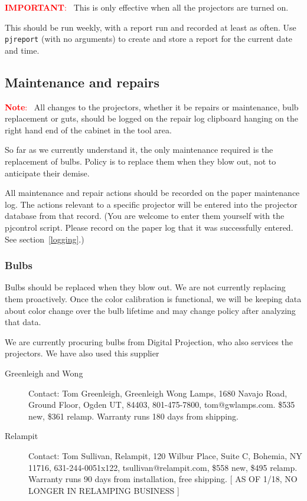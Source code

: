 \documentclass[11pt]{article}
\newenvironment{note}[1][Note]{\begin{lrbox}{\notebox}%
    \begin{minipage}{0.9\columnwidth}\textcolor{red}{\textbf{#1}:~}}%
    {\end{minipage}\end{lrbox}\begin{center}\setlength{\fboxsep}{8pt}%
    \fbox{\usebox{\notebox}}\end{center}}
\newcommand{\cmd}[1]{\texttt{#1}\xspace}
\begin{document}
\begin{note}[IMPORTANT]
This is only effective when all the projectors are turned on.
\end{note}

This should be run weekly, with a report run and recorded at least as
often.  Use \cmd{pjreport} (with no arguments) to create and store a
report for the current date and time.

\subsection{Maintenance and repairs}

\begin{note}[Note]
All changes to the projectors, whether it be repairs or maintenance,
bulb replacement or guts, should be logged on the repair log clipboard
hanging on the right hand end of the cabinet in the tool area.
\end{note}

So far as we currently understand it, the only maintenance required is
the replacement of bulbs.  Policy is to replace them when they blow
out, not to anticipate their demise.

All maintenance and repair actions should be recorded on the paper
maintenance log.  The actions relevant to a specific projector will be
entered into the projector database from that record.  (You
are welcome to enter them yourself with the pjcontrol script.  Please
record on the paper log that it was successfully entered.  See
section~\ref{logging}.)


\subsubsection{Bulbs}

Bulbs should be replaced when they blow out.  We are not currently
replacing them proactively.  Once the color calibration is functional,
we will be keeping data about color change over the bulb lifetime and
may change policy after analyzing that data.

We are currently procuring bulbs from Digital Projection, who also
services the projectors.  We have also used this supplier



\begin{description}

\item[Greenleigh and Wong] Contact: Tom Greenleigh, Greenleigh Wong Lamps, 1680
Navajo Road, Ground Floor, Ogden UT, 84403, 801-475-7800,
tom@gwlamps.com. \$535 new, \$361 relamp.  Warranty runs 180 days from
shipping.

\item[Relampit] Contact: Tom Sullivan, Relampit, 120 Wilbur Place, Suite C,
Bohemia, NY 11716, 631-244-0051x122, tsullivan@relampit.com, \$558
new, \$495 relamp.  Warranty runs 90 days from installation, free
shipping.  [ AS OF 1/18, NO LONGER IN RELAMPING BUSINESS ] 

\end{description}
\end{document}
